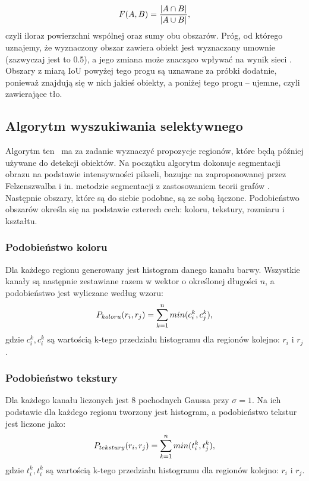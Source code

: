 \documentclass[a4paper,twoside,12pt]{book}
\begin{document}
{{\begin{equation}
F(A,B) = \frac{| A \cap B|}{ |A \cup B|},\\
\end{equation}
czyli iloraz powierzchni wspólnej oraz sumy obu obszarów. Próg, od którego uznajemy, że wyznaczony obszar zawiera obiekt jest wyznaczany umownie (zazwyczaj jest to 0.5), a jego zmiana może znacząco wpływać na wynik sieci \cite{girshick2014rich}. Obszary z miarą IoU powyżej tego progu są uznawane za próbki dodatnie, ponieważ znajdują się w nich jakieś obiekty, a poniżej tego progu – ujemne, czyli zawierające tło.}

\subsection{Algorytm wyszukiwania selektywnego}
\label{ss}
{Algorytm ten~\cite{uijlings2013selective} ma za zadanie wyznaczyć propozycje regionów, które będą później używane do detekcji obiektów. Na początku algorytm dokonuje segmentacji obrazu na podstawie intensywności pikseli, bazując na zaproponowanej przez Felzenszwalba i in. metodzie segmentacji z zastosowaniem teorii grafów \cite{felzenszwalb2004efficient}. Następnie obszary, które są do siebie podobne, są ze sobą łączone. Podobieństwo obszarów określa się na podstawie czterech cech: koloru, tekstury, rozmiaru i kształtu.}
\subsubsection{Podobieństwo koloru}
{Dla każdego regionu generowany jest histogram danego kanału barwy. Wszystkie kanały są następnie zestawiane razem w wektor o określonej długości $n$, a podobieństwo jest wyliczane według wzoru:
\begin{equation}
P_{koloru}(r_{i},r_{j})= \sum_{k=1}^{n} min(c_{i}^k,c_{j}^k),\\
\end{equation}
gdzie $c_{i}^k, c_{i}^k$ są wartością k-tego przedziału histogramu dla regionów kolejno: $r_{i}$ i $r_{j}$.
}
\subsubsection{Podobieństwo tekstury}
{
Dla każdego kanału liczonych jest 8 pochodnych Gaussa przy $\sigma=1$. Na ich podstawie dla każdego regionu tworzony jest histogram, a podobieństwo tekstur jest liczone jako:
\begin{equation}
P_{tekstury}(r_{i},r_{j})= \sum_{k=1}^{n} min(t_{i}^k,t_{j}^k),\\
\end{equation}
gdzie $t_{i}^k,  t_{i}^k$ są wartością k-tego przedziału histogramu dla regionów kolejno: $r_{i}$ i $r_{j}$.

}}
\end{document}
